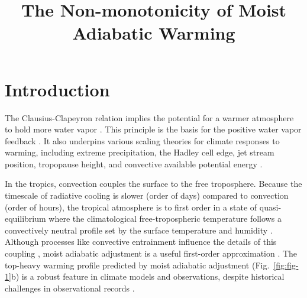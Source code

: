 \documentclass[draft,twocol]{ametsocV6.1}
\title{The Non-monotonicity of Moist Adiabatic Warming}
\affiliation{\aff{a}{Department of Geosciences, Union College, Schenectady New York, USA}}
\begin{document}
\maketitle

%
\section{Introduction}

The Clausius-Clapeyron relation implies the potential for a warmer atmosphere to hold more water vapor \citep{emanuel1994}. This principle is the basis for the positive water vapor feedback \citep{held2000a}. It also underpins various scaling theories for climate responses to warming, including extreme precipitation, the Hadley cell edge, jet stream position, tropopause height, and convective available potential energy \citep[CAPE;][]{oGorman2015, shaw2016b, romps2016}. 

In the tropics, convection couples the surface to the free troposphere. Because the timescale of radiative cooling is slower (order of days) compared to convection (order of hours), the tropical atmosphere is to first order in a state of quasi-equilibrium where the climatological free-tropospheric temperature follows a convectively neutral profile set by the surface temperature and humidity \cite{arakawa1974}. Although processes like convective entrainment influence the details of this coupling \citep{miyawaki2020, keil2021}, moist adiabatic adjustment is a useful first-order approximation \citep{held1993}. The top-heavy warming profile predicted by moist adiabatic adjustment (Fig.~\ref{fig:fig-1}b) is a robust feature in climate models and observations, despite historical challenges in observational records \citep{vallis2015, santer2005}.
\end{document}
